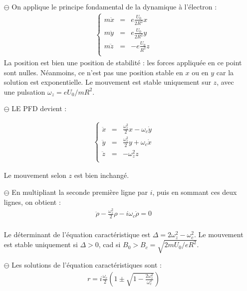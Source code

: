 \documentclass{report}
\begin{document}
\begin{itemize}

	\item[$\ominus$] On applique le principe fondamental de la dynamique à l'électron :
\begin{align*}
	\left\lbrace
\begin{array}{ccc}
 m\ddot{x} &=&  e\frac{U_0}{2R^2}x \\
 m\ddot{y} &=& e\frac{U_0}{2R^2}y \\
 m\ddot{z} &= & -e\frac{U_0}{R^2}z \\
\end{array}\right.
\end{align*}
La position est bien une position de stabilité : les forces appliquée en ce point sont nulles. Néanmoins, ce n'est pas une position stable en $x$ ou en $y$ car la solution est exponentielle. Le mouvement est stable uniquement sur $z$, avec une pulsation $\omega_z=eU_0/mR^2$.

		\item[$\ominus$] LE PFD devient :
		
\begin{align*}
	\left\lbrace
\begin{array}{ccc}
 \ddot{x} &=&  \frac{\omega_z^2}{2}x - \omega_c\dot{y}\\
 \ddot{y} &=& \frac{\omega_z^2}{2}y + \omega_c\dot{x} \\
 \ddot{z} &= & -\omega_z^2z \\
\end{array}\right.
\end{align*}

Le mouvement selon $z$ est bien inchangé. 

		\item[$\ominus$] En multipliant la seconde première ligne par $i$, puis en sommant ces deux lignes, on obtient :
		\begin{align*}
 \ddot{\rho} - \frac{\omega_z^2}{2}\rho - i\omega_c\dot{\rho}=0\\
\end{align*}
		
		Le déterminant de l'équation caractéristique est $\Delta=2\omega_z^2-\omega_c^2$. Le mouvement est stable uniquement si $\Delta>0$, cad si $B_0>B_c=\sqrt{2mU_0/eR^2}$.
		
		\item[$\ominus$] Les solutions de l'équation caractéristiques sont :
		\begin{align*}
			r=i\frac{\omega_c}{2}\left( 1 \pm\sqrt{1- \frac{2\omega_z^2}{\omega_c^2}}\right) 
		\end{align*}
		

\end{itemize}
\end{document}
